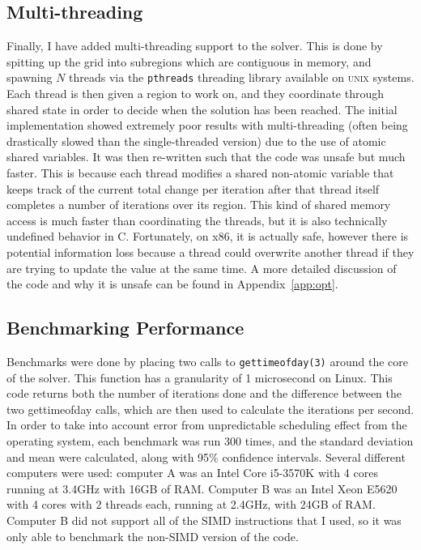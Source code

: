 \subsection{Multi-threading}
Finally, I have added multi-threading support to the solver. This is done by spitting up the grid into subregions which
are contiguous in memory, and spawning $N$ threads via the \texttt{pthreads} threading library available on \textsc{unix} systems. Each thread is then given a region to work on,
and they coordinate through shared state in order to decide when the solution has been reached. The initial implementation
showed extremely poor results with multi-threading (often being drastically slowed than the single-threaded version)
due to the use of atomic shared variables. It was then re-written such that the code was unsafe but much faster. This
is because each thread modifies a shared non-atomic variable that keeps track of the current total change per iteration
after that thread itself completes a number of iterations over its region. This kind of shared memory access is much faster
than coordinating the threads, but it is also technically undefined behavior in C. Fortunately, on x86, it is actually
safe, however there is potential information loss because a thread could overwrite another thread if they are trying to
update the value at the same time. A more detailed discussion of the code and why it is unsafe can be found in Appendix~\ref{app:opt}.


















\subsection{Benchmarking Performance}
Benchmarks were done by placing two calls to \texttt{gettimeofday(3)} around the core of the solver. This function has a
granularity of 1 microsecond on Linux\cite{gtod}. This code returns
both the number of iterations done and the difference between the two gettimeofday calls, which are then used to calculate
the iterations per second. In order to take into account error from unpredictable scheduling effect from the operating system,
each benchmark was run 300 times, and the standard deviation and mean were calculated, along with 95\% confidence intervals. Several different computers were used:
computer A was an Intel Core i5-3570K with 4 cores running at 3.4GHz with 16GB of RAM. Computer B was an Intel Xeon E5620
with 4 cores with 2 threads each, running at 2.4GHz, with 24GB of RAM. Computer B did not support all of the SIMD instructions
that I used, so it was only able to benchmark the non-SIMD version of the code.

